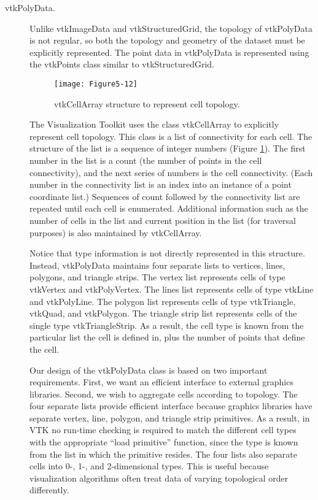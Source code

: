 \begin{description}
\item[vtkPolyData.] Unlike vtkImageData and vtkStructuredGrid, the topology of vtkPolyData is not regular, so both the topology and geometry of the dataset must be explicitly represented. The point data in vtkPolyData is represented using the vtkPoints class similar to vtkStructuredGrid.

\begin{figure}[!htb]
	\centering
	\texttt{[image: Figure5-12]}
	\caption{vtkCellArray structure to represent cell topology.}
	\label{fig:Figure5-12}
\end{figure}

The Visualization Toolkit uses the class vtkCellArray to explicitly represent cell topology. This class is a list of connectivity for each cell. The structure of the list is a sequence of integer numbers (Figure \ref{fig:Figure5-12}). The first number in the list is a count (the number of points in the cell connectivity), and the next series of numbers is the cell connectivity. (Each number in the connectivity list is an index into an instance of a point coordinate list.) Sequences of count followed by the connectivity list are repeated until each cell is enumerated. Additional information such as the number of cells in the list and current position in the list (for traversal purposes) is also maintained by vtkCellArray.

Notice that type information is not directly represented in this structure. Instead, vtkPolyData maintains four separate lists to vertices, lines, polygons, and triangle strips. The vertex list represents cells of type vtkVertex and vtkPolyVertex. The lines list represents cells of type vtkLine and vtkPolyLine. The polygon list represents cells of type vtkTriangle, vtkQuad, and vtkPolygon. The triangle strip list represents cells of the single type vtkTriangleStrip. As a result, the cell type is known from the particular list the cell is defined in, plus the number of points that define the cell.

Our design of the vtkPolyData class is based on two important requirements. First, we want an efficient interface to external graphics libraries. Second, we wish to aggregate cells according to topology. The four separate lists provide efficient interface because graphics libraries have separate vertex, line, polygon, and triangle strip primitives. As a result, in VTK no run-time checking is required to match the different cell types with the appropriate “load primitive” function, since the type is known from the list in which the primitive resides. The four lists also separate cells into 0-, 1-, and 2-dimensional types. This is useful because visualization algorithms often treat data of varying topological order differently.


\end{description}
